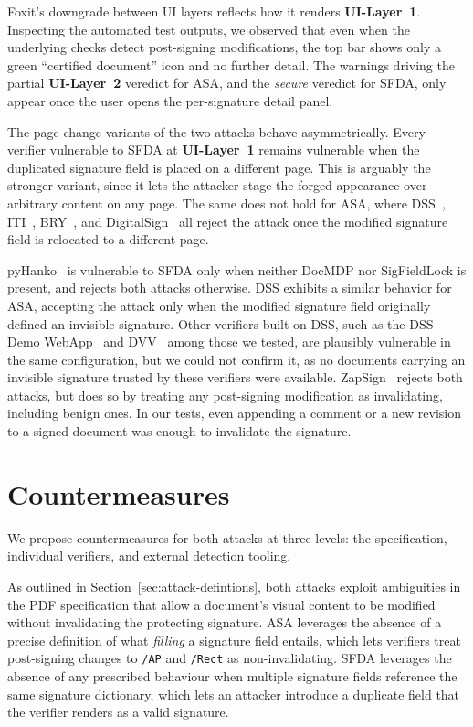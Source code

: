 \documentclass[12pt]{article}
\begin{document}
Foxit's downgrade between UI layers reflects how it renders \textbf{UI-Layer~1}. Inspecting the automated test outputs, we observed that even when the underlying checks detect post-signing modifications, the top bar shows only a green ``certified document'' icon and no further detail. The warnings driving the partial \textbf{UI-Layer~2} veredict for ASA, and the \emph{secure} veredict for SFDA, only appear once the user opens the per-signature detail panel.

The page-change variants of the two attacks behave asymmetrically. Every verifier vulnerable to SFDA at \textbf{UI-Layer~1} remains vulnerable when the duplicated signature field is placed on a different page. This is arguably the stronger variant, since it lets the attacker stage the forged appearance over arbitrary content on any page. The same does not hold for ASA, where DSS~\cite{eudss}, ITI~\cite{itivalidador}, BRY~\cite{bry}, and DigitalSign~\cite{digitalsign} all reject the attack once the modified signature field is relocated to a different page.

pyHanko~\cite{pyhanko} is vulnerable to SFDA only when neither DocMDP nor SigFieldLock is present, and rejects both attacks otherwise. DSS exhibits a similar behavior for ASA, accepting the attack only when the modified signature field originally defined an invisible signature. Other verifiers built on DSS, such as the DSS Demo WebApp~\cite{dssdemo} and DVV~\cite{dvv} among those we tested, are plausibly vulnerable in the same configuration, but we could not confirm it, as no documents carrying an invisible signature trusted by these verifiers were available. ZapSign~\cite{zapsign} rejects both attacks, but does so by treating any post-signing modification as invalidating, including benign ones. In our tests, even appending a comment or a new revision to a signed document was enough to invalidate the signature.








\section{Countermeasures}

We propose countermeasures for both attacks at three levels: the specification, individual verifiers, and external detection tooling.

As outlined in Section~\ref{sec:attack-defintions}, both attacks exploit ambiguities in the PDF specification that allow a document's visual content to be modified without invalidating the protecting signature. ASA leverages the absence of a precise definition of what \emph{filling} a signature field entails, which lets verifiers treat post-signing changes to \texttt{/AP} and \texttt{/Rect} as non-invalidating. SFDA leverages the absence of any prescribed behaviour when multiple signature fields reference the same signature dictionary, which lets an attacker introduce a duplicate field that the verifier renders as a valid signature.
\end{document}
